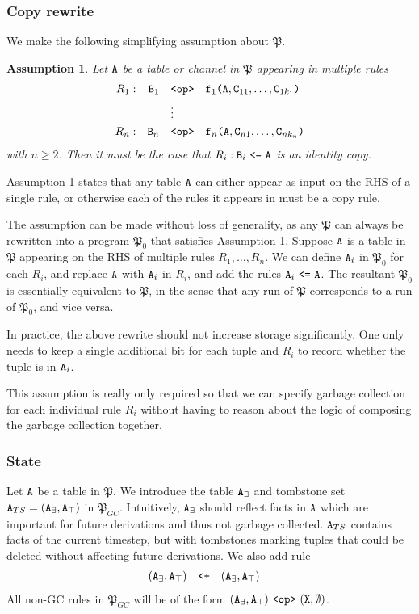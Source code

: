 \documentclass{article}
\numberwithin{equation}{section}
\newtheorem{assumption}[property]{Assumption}
\renewcommand{\tt}[1]{\ifmmode\text{\texttt{#1}}\else\texttt{#1}\fi}
\begin{document}
\subsubsection{Copy rewrite}
We make the following simplifying assumption about $\mathfrak{P}$.
\begin{assumption}
\label{ass:copy}
Let $\tt{A}$ be a table or channel in $\mathfrak{P}$ appearing in multiple rules
\begin{align*}
R_1: && \tt{B}_1 &\quad\tt{<op>}\quad \tt{f}_1\tt{(}\tt{A},\tt{C}_{11},\dots,\tt{C}_{1k_1}\tt{)}\\
&&&\quad\vdots\\
R_n: && \tt{B}_n &\quad\tt{<op>}\quad \tt{f}_n\tt{(}\tt{A},\tt{C}_{n1},\dots,\tt{C}_{nk_n}\tt{)}
\end{align*}
with $n \geq 2$.
Then it must be the case that $R_i: \tt{B}_i ~\tt{<=}~ \tt{A}$ is an identity copy.
\end{assumption}
Assumption \ref{ass:copy} states that any table $\tt{A}$ can either appear as input on the RHS of a single rule, or otherwise each of the rules it appears in must be a copy rule.

The assumption can be made without loss of generality, as any $\mathfrak{P}$ can always be rewritten into a program $\mathfrak{P}_0$ that satisfies Assumption \ref{ass:copy}.
Suppose $\tt{A}$ is a table in $\mathfrak{P}$ appearing on the RHS of multiple rules $R_1,\dots,R_n$.
We can define $\tt{A}_i$ in $\mathfrak{P}_0$ for each $R_i$, and replace $\tt{A}$ with $\tt{A}_i$ in $R_i$, and add the rules $\tt{A}_i ~\tt{<=}~ \tt{A}$.
The resultant $\mathfrak{P}_0$ is essentially equivalent to $\mathfrak{P}$, in the sense that any run of $\mathfrak{P}$ corresponds to a run of $\mathfrak{P}_0$, and vice versa.

In practice, the above rewrite should not increase storage significantly.
One only needs to keep a single additional bit for each tuple and $R_i$ to record whether the tuple is in $\tt{A}_i$.

This assumption is really only required so that we can specify garbage collection for each individual rule $R_i$ without having to reason about the logic of composing the garbage collection together.

\subsubsection{State}
Let $\tt{A}$ be a table in $\mathfrak{P}$.
We introduce the table $\tt{A}_\exists$ and tombstone set $\tt{A}_{TS} = (\tt{A}_\exists, \tt{A}_\top)$ in $\mathfrak{P}_{GC}$.
Intuitively, $\tt{A}_\exists$ should reflect facts in $\tt{A}$ which are important for future derivations and thus not garbage collected.
$\tt{A}_{TS}$ contains facts of the current timestep, but with tombstones marking tuples that could be deleted without affecting future derivations.
We also add rule
\begin{align}
(\tt{A}_\exists, \tt{A}_\top) &\quad\tt{<+}\quad (\tt{A}_\exists, \tt{A}_\top)\label{eq:aexistmerge}
\end{align}
All non-GC rules in $\mathfrak{P}_{GC}$ will be of the form $(\tt{A}_\exists, \tt{A}_\top) ~\tt{<op>}~ (\tt{X}, \emptyset)$.
\end{document}
